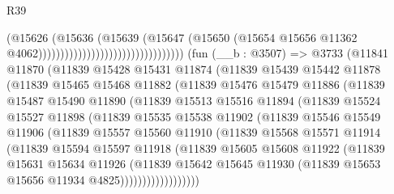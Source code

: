 \begin{lexlean}{R39}
\begin{coremodule}
                                                          (@15626
                                                            (@15636
                                                              (@15639
                                                                (@15647
                                                                  (@15650
                                                                    (@15654
                                                                      @15656
                                                                      @11362
                                                                      @4062)))))))))))))))))))))))))))))))))
    (fun (__b : @3507) =>
    @3733
      (@11841
        @11870
        (@11839
          @15428
          @15431
          @11874
          (@11839
            @15439
            @15442
            @11878
            (@11839
              @15465
              @15468
              @11882
              (@11839
                @15476
                @15479
                @11886
                (@11839
                  @15487
                  @15490
                  @11890
                  (@11839
                    @15513
                    @15516
                    @11894
                    (@11839
                      @15524
                      @15527
                      @11898
                      (@11839
                        @15535
                        @15538
                        @11902
                        (@11839
                          @15546
                          @15549
                          @11906
                          (@11839
                            @15557
                            @15560
                            @11910
                            (@11839
                              @15568
                              @15571
                              @11914
                              (@11839
                                @15594
                                @15597
                                @11918
                                (@11839
                                  @15605
                                  @15608
                                  @11922
                                  (@11839
                                    @15631
                                    @15634
                                    @11926
                                    (@11839
                                      @15642
                                      @15645
                                      @11930
                                      (@11839 @15653 @15656 @11934 @4825))))))))))))))))))

\end{coremodule}
\end{lexlean}
